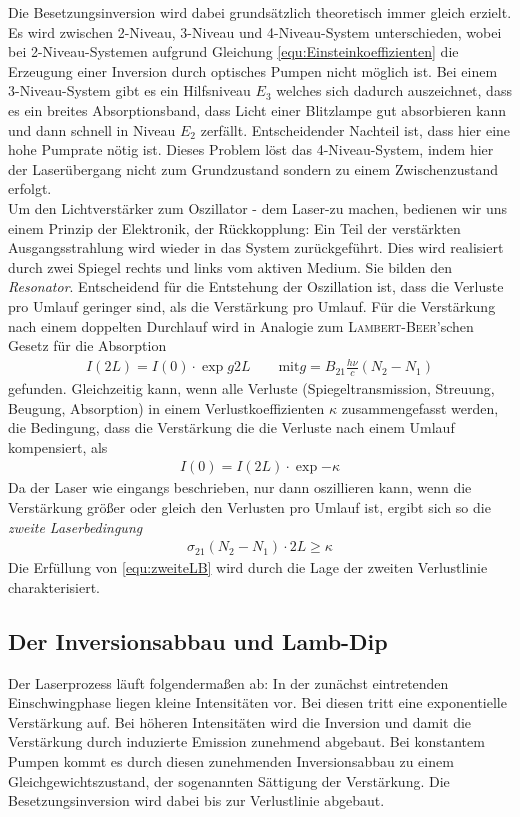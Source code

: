 \documentclass[a4paper,twoside,final]{article}
\begin{document}
Die Besetzungsinversion wird dabei grundsätzlich theoretisch immer gleich erzielt. Es wird zwischen 2-Niveau, 3-Niveau und 4-Niveau-System unterschieden, wobei bei 2-Niveau-Systemen aufgrund Gleichung \eqref{equ:Einsteinkoeffizienten} die Erzeugung einer Inversion durch optisches Pumpen nicht möglich ist. Bei einem 3-Niveau-System gibt es ein Hilfsniveau $E_3$ welches sich dadurch auszeichnet, dass es ein breites Absorptionsband, dass Licht einer Blitzlampe gut absorbieren kann und dann schnell in Niveau $E_2$ zerfällt. Entscheidender Nachteil ist, dass hier eine hohe Pumprate nötig ist. Dieses Problem löst das 4-Niveau-System, indem hier der Laserübergang nicht zum Grundzustand sondern zu einem Zwischenzustand erfolgt. \\
Um den Lichtverstärker zum Oszillator - dem Laser-zu machen, bedienen wir uns einem Prinzip der Elektronik, der Rückkopplung: Ein Teil der verstärkten Ausgangsstrahlung wird wieder in das System zurückgeführt. Dies wird realisiert durch zwei Spiegel rechts und links vom aktiven Medium. Sie bilden den \textit{Resonator}. Entscheidend für die Entstehung der Oszillation ist, dass die Verluste pro Umlauf geringer sind, als die Verstärkung pro Umlauf. Für die Verstärkung nach einem doppelten Durchlauf wird in Analogie zum \textsc{Lambert-Beer}'schen Gesetz für die Absorption
\begin{align}
  I(2L)=I(0)\cdot \exp{g2L} \qquad \text{mit} g = B_{21} \frac{h\nu}{c} (N_2-N_1)
\end{align}
gefunden. Gleichzeitig kann, wenn alle Verluste (Spiegeltransmission, Streuung, Beugung, Absorption) in einem Verlustkoeffizienten $\kappa$ zusammengefasst werden, die Bedingung, dass die Verstärkung die die Verluste nach einem Umlauf kompensiert, als
\begin{align}
  I(0)=I(2L)\cdot \exp{-\kappa}
\end{align}
Da der Laser wie eingangs beschrieben, nur dann oszillieren kann, wenn die Verstärkung größer oder gleich den Verlusten pro Umlauf ist, ergibt sich so die \textit{zweite Laserbedingung}
\begin{align}
  \boxed{\sigma_{21}(N_2-N_1)\cdot2L \geq \kappa}
  \label{equ:zweiteLB}
\end{align}
Die Erfüllung von \eqref{equ:zweiteLB} wird durch die Lage der zweiten Verlustlinie charakterisiert.


\subsection{Der Inversionsabbau und Lamb-Dip}
 Der Laserprozess läuft folgendermaßen ab: In der zunächst eintretenden Einschwingphase liegen kleine Intensitäten vor. Bei diesen tritt eine exponentielle Verstärkung auf. Bei höheren Intensitäten wird die Inversion und damit die Verstärkung durch induzierte Emission zunehmend abgebaut. Bei konstantem Pumpen kommt es durch diesen zunehmenden Inversionsabbau zu einem Gleichgewichtszustand, der sogenannten Sättigung der Verstärkung. Die Besetzungsinversion wird dabei bis zur Verlustlinie abgebaut.
\end{document}
